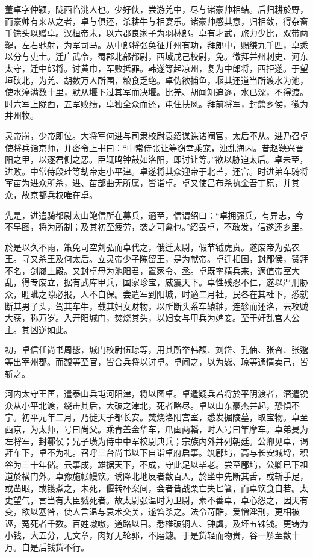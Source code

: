 \documentclass[12pt,UTF8]{ctexbook}
\begin{document}
董卓字仲颖，陇西临洮人也。少好侠，尝游羌中，尽与诸豪帅相结。后归耕於野，而豪帅有来从之者，卓与俱还，杀耕牛与相宴乐。诸豪帅感其意，归相敛，得杂畜千馀头以赠卓。汉桓帝末，以六郡良家子为羽林郎。卓有才武，旅力少比，双带两鞬，左右驰射，为军司马。从中郎将张奂征并州有功，拜郎中，赐缣九千匹，卓悉以分与吏士。迁广武令，蜀郡北部都尉，西域戊己校尉，免。徵拜并州刺史、河东太守，迁中郎将。讨黄巾，军败抵罪。韩遂等起凉州，复为中郎将，西拒遂。于望垣硖北，为羌、胡数万人所围，粮食乏绝。卓伪欲捕鱼，堰其还道当所渡水为池，使水渟满数十里，默从堰下过其军而决堰。比羌、胡闻知追逐，水已深，不得渡。时六军上陇西，五军败绩，卓独全众而还，屯住扶风。拜前将军，封斄乡侯，徵为并州牧。

灵帝崩，少帝即位。大将军何进与司隶校尉袁绍谋诛诸阉官，太后不从。进乃召卓使将兵诣京师，并密令上书曰：“中常侍张让等窃幸乘宠，浊乱海内。昔赵鞅兴晋阳之甲，以逐君侧之恶。臣辄鸣钟鼓如洛阳，即讨让等。”欲以胁迫太后。卓未至，进败。中常侍段珪等劫帝走小平津。卓遂将其众迎帝于北芒，还宫。时进弟车骑将军苗为进众所杀，进、苗部曲无所属，皆诣卓。卓又使吕布杀执金吾丁原，并其众，故京都兵权唯在卓。

先是，进遣骑都尉太山鲍信所在募兵，適至，信谓绍曰：“卓拥强兵，有异志，今不早图，将为所制；及其初至疲劳，袭之可禽也。”绍畏卓，不敢发，信遂还乡里。

於是以久不雨，策免司空刘弘而卓代之，俄迁太尉，假节钺虎贲。遂废帝为弘农王。寻又杀王及何太后。立灵帝少子陈留王，是为献帝。卓迁相国，封郿侯，赞拜不名，剑履上殿。又封卓母为池阳君，置家令、丞。卓既率精兵来，適值帝室大乱，得专废立，据有武库甲兵，国家珍宝，威震天下。卓性残忍不仁，遂以严刑胁众，睚眦之隙必报，人不自保。尝遣军到阳城，时適二月社，民各在其社下，悉就断其男子头，驾其车牛，载其妇女财物，以所断头系车辕轴，连轸而还洛，云攻贼大获，称万岁。入开阳城门，焚烧其头，以妇女与甲兵为婢妾。至于奸乱宫人公主。其凶逆如此。

初，卓信任尚书周毖，城门校尉伍琼等，用其所举韩馥、刘岱、孔伷、张咨、张邈等出宰州郡。而馥等至官，皆合兵将以讨卓。卓闻之，以为毖、琼等通情卖己，皆斩之。

河内太守王匡，遣泰山兵屯河阳津，将以图卓。卓遣疑兵若将於平阴渡者，潜遣锐众从小平北渡，绕击其后，大破之津北，死者略尽。卓以山东豪杰并起，恐惧不宁。初平元年二月，乃徙天子都长安。焚烧洛阳宫室，悉发掘陵墓，取宝物。卓至西京，为太师，号曰尚父。乘青盖金华车，爪画两轓，时人号曰竿摩车。卓弟旻为左将军，封鄠侯；兄子璜为侍中中军校尉典兵；宗族内外并列朝廷。公卿见卓，谒拜车下，卓不为礼。召呼三台尚书以下自诣卓府启事。筑郿坞，高与长安城埒，积谷为三十年储。云事成，雄据天下，不成，守此足以毕老。尝至郿坞，公卿已下祖道於横门外。卓豫施帐幔饮。诱降北地反者数百人，於坐中先断其舌，或斩手足，或凿眼，或镬煮之，未死，偃转杯案间，会者皆战栗亡失匕箸，而卓饮食自若。太史望气，言当有大臣戮死者。故太尉张温时为卫尉，素不善卓，卓心怨之，因天有变，欲以塞咎，使人言温与袁术交关，遂笞杀之。法令苛酷，爱憎淫刑，更相被诬，冤死者千数。百姓嗷嗷，道路以目。悉椎破铜人、钟虡，及坏五铢钱。更铸为小钱，大五分，无文章，肉好无轮郭，不磨鑢。于是货轻而物贵，谷一斛至数十万。自是后钱货不行。
\end{document}
